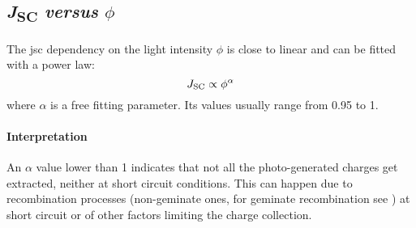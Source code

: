 	\subsection{\textit{J}\textsubscript{SC} \textsl{versus} $\phi$}\label{jsc-phi}
		The \gls{jsc} dependency on the light intensity $\phi$ is close to linear and can be fitted with a power law:
		\begin{equation} \label{eq:jsc-phi}
			J_\mathrm{SC} \propto \phi^\alpha
		\end{equation}
		where $\alpha$ is a free fitting parameter. Its values usually range from 0.95 to 1.

		\paragraph{Interpretation}
		An $\alpha$ value lower than 1 indicates that not all the photo\hyp{}generated charges get extracted, neither at short circuit conditions.
		This can happen due to recombination processes (non-geminate ones, for geminate recombination see ) at short circuit \cite{Credgington2011} or of other factors limiting the charge collection.

